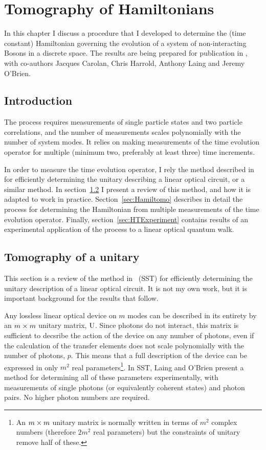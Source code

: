 \chapter{Tomography of Hamiltonians}
\label{ch:Hamiltomo}
In this chapter I discuss a procedure that I developed to determine the
(time constant) Hamiltonian governing the evolution of a system of
non-interacting Bosons in a discrete space. The results are being prepared for
publication in \cite{hamiltomo}, with co-authors Jacques Carolan, Chris Harrold,
Anthony Laing and Jeremy O'Brien.

\section{Introduction}
\label{sec:HTIntro}
The process requires measurements of
single particle states and two particle correlations, and the number of
measurements scales polynomially with the number of system modes. It relies on
making measurements of the time evolution operator for multiple (minimum two,
preferably at least three) time increments.

In order to measure the time
evolution operator, I rely the method described in~\cite{sst} for efficiently
determining the unitary describing a linear optical circuit, or a similar
method. In section~\ref{sec:SST} I present a review of this method, and how it
is adapted to work in practice. Section~\ref{sec:Hamiltomo} describes in detail
the process for determining the Hamiltonian from multiple measurements of the
time evolution operator. Finally, section~\ref{sec:HTExperiment} contains
results of an experimental application of the process to a linear optical
quantum walk.

\section{Tomography of a unitary}
\label{sec:SST}
This section is a review of the method in~\cite{sst} (SST) for efficiently
determining the unitary description of a linear optical circuit. It is not my
own work, but it is important background for the results that follow.

Any lossless linear optical device on \(m\) modes can be described in its
entirety by an
\(m \times m\) unitary matrix, \(\mathrm{U}\). Since photons do not interact, this
matrix is sufficient to decsribe the action of the device on any number of
photons, even if the calculation of the transfer elements does not scale
polynomially with the number of photons, \(p\). This means that a full
description of the device can be expressed in only \(m^{2}\) real
parameters\footnote{An \(m \times m\) unitary matrix is normally written in terms
of \(m^{2}\) complex numbers (therefore \(2m^{2}\) real parameters) but the
constraints of unitary remove half of these.}. In SST, Laing and O'Brien
present a method for determining all of these parameters experimentally, with
measurements of single photons (or equivalently coherent states) and photon
pairs. No higher photon numbers are required.

